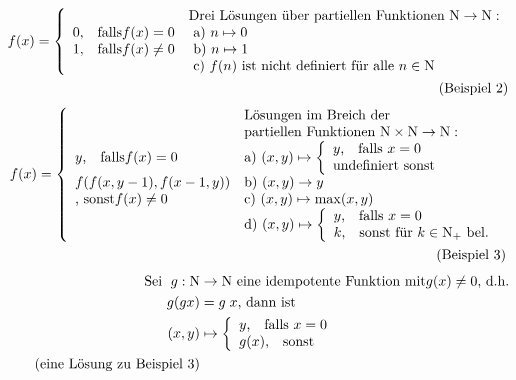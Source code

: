 \begin{compactitem}
\begin{align*}
	f(x) = 
	\left\lbrace\begin{array}{l l}
	&\text{Drei Lösungen über partiellen Funktionen } \mathrm{N} \rightarrow \mathrm{N}:\\
	0\text{,} \quad\text{falls} f(x)=0 &\text{ a) } n \mapsto 0\\
	1\text{,} \quad\text{falls} f(x)\neq0 &\text{ b) } n \mapsto 1\\
	&\text{ c) } f(n) \text{ ist nicht definiert für alle } n \in \mathrm{N}\\
	\end{array}\right.\\\tag{Beispiel 2}\\
	\end{align*}
	\begin{align*}
	f(x) = 
	\left\lbrace\begin{array}{l l}
	&\text{Lösungen im Breich der}\\
	&\text{partiellen Funktionen } \mathrm{N} \times \mathrm{N} \rightarrow \mathrm{N}:\\
	y\text{,} \quad\text{falls} f(x)=0 &\text{a) } (x,y) \mapsto
		\left\lbrace\begin{array}{l l}
		y\text{,} \quad\text{falls } x=0\\
		\text{undefiniert sonst}\\ 
		\end{array}\right.\\
	f(f(x,y-1), f(x-1,y)) &\text{b) } (x,y) \rightarrow y\\
	\text{, sonst} f(x)\neq 0 &\text{c) } (x,y) \mapsto \max(x,y)\\
	&\text{d) } (x,y) \mapsto 
		\left\lbrace\begin{array}{l l}
		y\text{,} \quad\text{falls } x=0\\
		k\text{,} \quad\text{sonst für } k \in \mathrm{N}_+ \text{ bel.}\\ 
		\end{array}\right.\\
	\end{array}\right.\\\tag{Beispiel 3}\\
	\end{align*}
	\begin{align*}
	\text{Sei }\;g: \mathrm{N} &\rightarrow \mathrm{N} \text{ eine idempotente Funktion mit} g(x) \neq 0 \text{, d.h.}\\
	g(g x) &= g \; x \text{, dann ist}\\
	(x,y) &\mapsto 
		\left\lbrace\begin{array}{l l}
		y\text{,} \quad\text{falls } x=0\\
		g(x)\text{,} \quad\text{sonst }\\ 
		\end{array}\right. \\\tag{eine Lösung zu Beispiel 3}\\
	\end{align*}
\end{compactitem}

